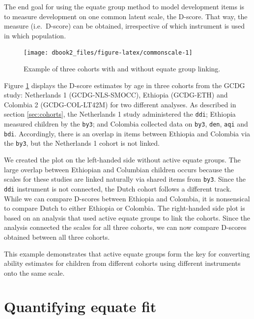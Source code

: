 \documentclass[
]{book}
\begin{document}
The end goal for using the equate group method to model development items is to measure development on one common latent scale, the D-score. That way, the measure (i.e.~D-score) can be obtained, irrespective of which instrument is used in which population.

\begin{figure}

{\centering \texttt{[image: dbook2\_files/figure-latex/commonscale-1]} 

}

\caption{Example of three cohorts with and without equate group linking.}\label{fig:commonscale}
\end{figure}



Figure \ref{fig:commonscale} displays the D-score estimates by age in three cohorts from the GCDG study: Netherlands 1 (GCDG-NLS-SMOCC), Ethiopia (GCDG-ETH) and Colombia 2 (GCDG-COL-LT42M) for two different analyses. As described in section \ref{sec:cohorts}, the Netherlands 1 study administered the \texttt{ddi}; Ethiopia measured children by the \texttt{by3}; and Colombia collected data on \texttt{by3}, \texttt{den}, \texttt{aqi} and \texttt{bdi}. Accordingly, there is an overlap in items between Ethiopia and Colombia via the \texttt{by3}, but the Netherlands 1 cohort is not linked.

We created the plot on the left-handed side without active equate groups. The large overlap between Ethiopian and Columbian children occurs because the scales for these studies are linked naturally via shared items from \texttt{by3}. Since the \texttt{ddi} instrument is not connected, the Dutch cohort follows a different track. While we can compare D-scores between Ethiopia and Colombia, it is nonsensical to compare Dutch to either Ethiopia or Colombia. The right-handed side plot is based on an analysis that used active equate groups to link the cohorts. Since the analysis connected the scales for all three cohorts, we can now compare D-scores obtained between all three cohorts.

This example demonstrates that active equate groups form the key for converting ability estimates for children from different cohorts using different instruments onto the same scale.

\hypertarget{sec:equatefit}{%
\section{Quantifying equate fit}\label{sec:equatefit}}
\end{document}
